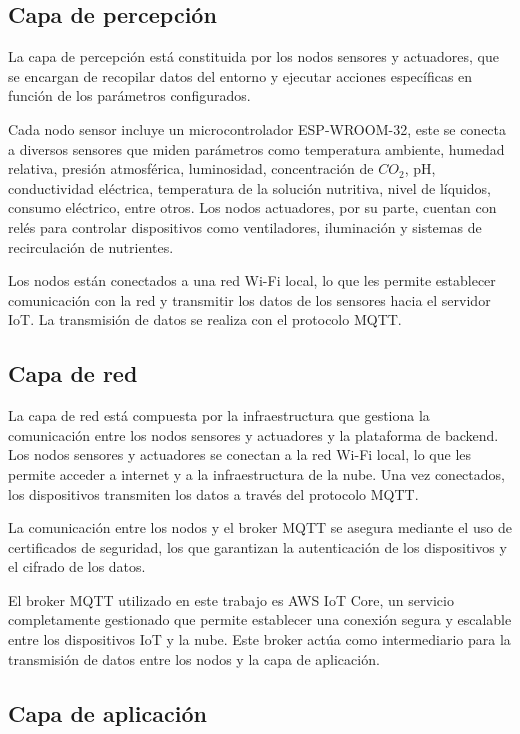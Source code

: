 \subsection{Capa de percepción}

La capa de percepción está constituida por los nodos sensores y actuadores, que
se encargan de recopilar datos del entorno y ejecutar acciones específicas en
función de los parámetros configurados.

Cada nodo sensor incluye un microcontrolador ESP-WROOM-32, este se conecta a
diversos sensores que miden parámetros como temperatura ambiente, humedad
relativa, presión atmosférica, luminosidad, concentración de $CO_2$, pH,
conductividad eléctrica, temperatura de la solución nutritiva, nivel de
líquidos, consumo eléctrico, entre otros. Los nodos actuadores, por su parte,
cuentan con relés para controlar dispositivos como ventiladores, iluminación y
sistemas de recirculación de nutrientes.

Los nodos están conectados a una red Wi-Fi local, lo que les permite establecer
comunicación con la red y transmitir los datos de los sensores hacia el
servidor IoT. La transmisión de datos se realiza con el protocolo MQTT.

\subsection{Capa de red}

La capa de red está compuesta por la infraestructura que gestiona la
comunicación entre los nodos sensores y actuadores y la plataforma de backend.
Los nodos sensores y actuadores se conectan a la red Wi-Fi local, lo que les
permite acceder a internet y a la infraestructura de la nube. Una vez
conectados, los dispositivos transmiten los datos a través del protocolo MQTT.

La comunicación entre los nodos y el broker MQTT se asegura mediante el uso de
certificados de seguridad, los que garantizan la autenticación de los
dispositivos y el cifrado de los datos.

El broker MQTT utilizado en este trabajo es AWS IoT Core, un servicio
completamente gestionado que permite establecer una conexión segura y escalable
entre los dispositivos IoT y la nube. Este broker actúa como intermediario para
la transmisión de datos entre los nodos y la capa de aplicación.

\subsection{Capa de aplicación}

